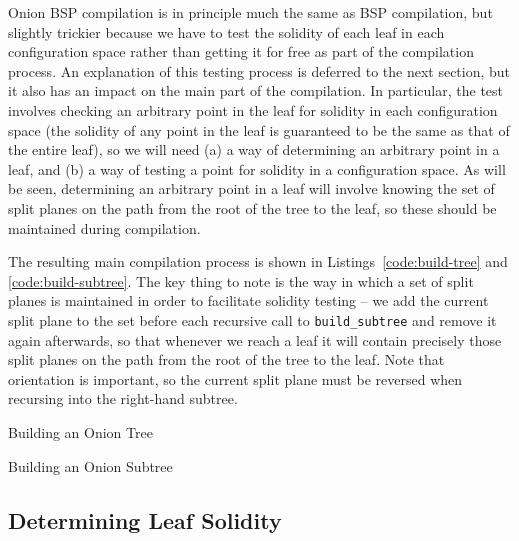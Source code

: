 \documentclass[10pt,twocolumn]{article}
\begin{document}
Onion BSP compilation is in principle much the same as BSP compilation, but slightly trickier because we have to test the solidity of each leaf in each configuration space rather than getting it for free as part of the compilation process. An explanation of this testing process is deferred to the next section, but it also has an impact on the main part of the compilation. In particular, the test involves checking an arbitrary point in the leaf for solidity in each configuration space (the solidity of any point in the leaf is guaranteed to be the same as that of the entire leaf), so we will need (a) a way of determining an arbitrary point in a leaf, and (b) a way of testing a point for solidity in a configuration space. As will be seen, determining an arbitrary point in a leaf will involve knowing the set of split planes on the path from the root of the tree to the leaf, so these should be maintained during compilation.

The resulting main compilation process is shown in Listings~\ref{code:build-tree} and \ref{code:build-subtree}. The key thing to note is the way in which a set of split planes is maintained in order to facilitate solidity testing -- we add the current split plane to the set before each recursive call to \texttt{build\_subtree} and remove it again afterwards, so that whenever we reach a leaf it will contain precisely those split planes on the path from the root of the tree to the leaf. Note that orientation is important, so the current split plane must be reversed when recursing into the right-hand subtree.

\begin{stulisting}[!t]
\caption{Building an Onion Tree}
\label{code:build-tree}

\end{stulisting}

\begin{stulisting}[!t]
\caption{Building an Onion Subtree}
\label{code:build-subtree}

\end{stulisting}

\subsection{Determining Leaf Solidity}
\end{document}
